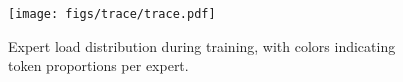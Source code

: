 \begin{figure}[h!tb]
    \centering
    \texttt{[image: figs/trace/trace.pdf]}

    \captionsetup{justification=raggedright}
    \caption{
        Expert load distribution during training, with colors indicating token proportions per expert.
    }
    \captionsetup{justification=centering}

    \label{fig:trace}
\end{figure}
